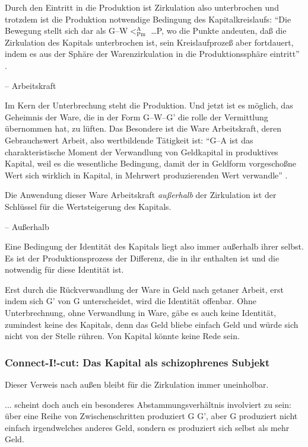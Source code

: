 \documentclass[12pt,
               DIV13,
               paper=a4,
               twoside=false,
               onehalfspacing,
               bibliography=totoc,
               toc=graduated,
               draft,
               ]{scrartcl}
\newcommand{\pc}[2]{\parencite[#1]{#2}}
\newcommand{\gwg}{G--W--G'\xspace}
\newcommand{\gwapmp}{G--W$<^{\text{A}}_{\text{Pm}}$ \dots P\xspace}
\begin{document}
Durch den Eintritt in die Produktion ist Zirkulation also unterbrochen
und trotzdem ist die Produktion notwendige Bedingung des
Kapitalkreislaufs: "`Die Bewegung stellt sich dar als \gwapmp, wo die Punkte andeuten,
daß die Zirkulation des Kapitals unterbrochen ist, sein
Kreislaufprozeß aber fortdauert, indem es aus der Sphäre der
Warenzirkulation in die Produktionssphäre eintritt"' \pc{40}{kap2}.

-- Arbeitskraft

Im Kern der Unterbrechung steht die Produktion. Und jetzt ist es
möglich, das Geheimnis der Ware, die in der Form \gwg die rolle der
Vermittlung übernommen hat, zu lüften. Das Besondere ist die Ware
Arbeitskraft, deren Gebrauchswert Arbeit, also wertbildende Tätigkeit
ist: "`G--A ist das charakteristische Moment der Verwandlung von
Geldkapital in produktives Kapital, weil es die wesentliche Bedingung,
damit der in Geldform vorgeschoßne Wert sich wirklich in Kapital, in
Mehrwert produzierenden Wert verwandle"' \pc{35}{kap2}.

Die Anwendung dieser Ware Arbeitskraft \emph{außerhalb} der
Zirkulation ist der Schlüssel für die Wertsteigerung des Kapitals.

-- Außerhalb

Eine Bedingung der Identität des Kapitals liegt also immer außerhalb
ihrer selbst. Es ist der Produktionsprozess der Differenz, die in ihr
enthalten ist und die notwendig für diese Identität ist.

Erst durch die Rückverwandlung der Ware in Geld nach \glq getaner
Arbeit\grq, erst indem sich G' von G unterscheidet, wird die Identität
offenbar. Ohne Unterbrechnung, ohne Verwandlung in Ware, gäbe es auch
keine Identität, zumindest keine des Kapitals, denn das Geld bliebe
einfach Geld und würde sich nicht von der Stelle rühren. Von Kapital
könnte keine Rede sein.



\subsubsection{Connect-I!-cut: Das Kapital als schizophrenes Subjekt}

Dieser Verweis nach außen bleibt für die Zirkulation immer
uneinholbar.

... scheint doch auch ein besonderes Abstammungsverhältnis involviert
zu sein: über eine Reihe von Zwischenschritten \glq produziert\grq{} G
G', aber G \grq produziert\grq{} nicht einfach irgendwelches anderes
Geld, sondern es produziert sich selbst als mehr Geld.
\end{document}
